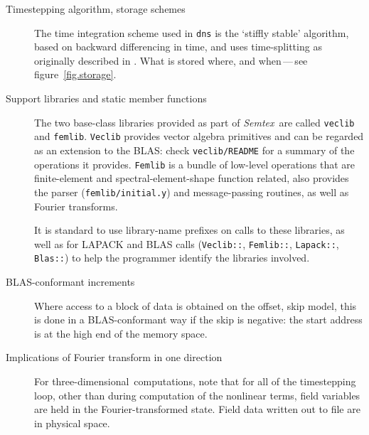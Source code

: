 \documentclass[11pt]{report}
\newcommand{\Semtex}{\emph{Semtex}} \newcommand{\Dog}{\emph{Dog}}
\newcommand\threed{three-di\-men\-sion\-al}
\newcommand\cpp{C\nolinebreak\hspace{-.05em}\raisebox{.3ex}{\footnotesize\bf
+}\nolinebreak\hspace{-.10em}\raisebox{.3ex}{\footnotesize\bf+}}
\begin{document}
\begin{description}
  
\item[Timestepping algorithm, storage schemes] The time integration
  scheme used in \verb|dns| is the `stiffly stable' algorithm, based
  on backward differencing in time, and uses time-splitting as
  originally described in \citet{kio91}. What is stored where, and
  when\,---\,see figure~\ref{fig.storage}.
  
  
\item[Support libraries and static member functions] The two
  base-class libraries provided as part of \Semtex\ are called
  \verb|veclib| and \verb|femlib|. \verb|Veclib| provides vector
  algebra primitives and can be regarded as an extension to the BLAS:
  check \verb|veclib/README| for a summary of the operations it
  provides.  \verb|Femlib| is a bundle of low-level operations that
  are finite-element and spectral-element-shape function related, 
  also provides the parser (\verb|femlib/initial.y|) and
  message-passing routines, as well as Fourier transforms.

  It is standard to use library-name prefixes on calls to these
  libraries, as well as for LAPACK and BLAS calls (\verb|Veclib::|,
  \verb|Femlib::|, \verb|Lapack::|, \verb|Blas::|) to help the
  programmer identify the libraries involved.
  
\item[BLAS-conformant increments] Where access to a block of data is
  obtained on the offset, skip model, this is done in a
  BLAS-conformant way if the skip is negative: the start address is at
  the high end of the memory space.

\item[Implications of Fourier transform in one direction] For
  \threed\ computations, note that for all of the timestepping loop,
  other than during computation of the nonlinear terms, field
  variables are held in the Fourier-transformed state.  Field data
  written out to file are in physical space.
  

\end{description}
\end{document}
